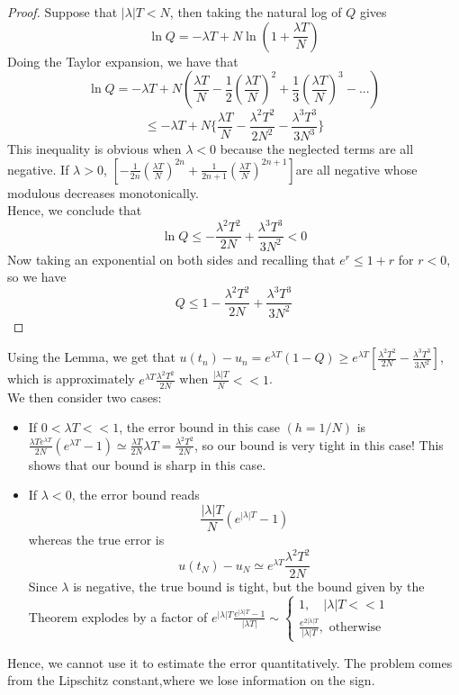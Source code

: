 \documentclass{article}
\begin{document}
\begin{remark}
\begin{enumerate}
\begin{proof}
    Suppose that $|\lambda| T < N$, then taking the natural log of $Q$ gives
    \[\ln Q = - \lambda T + N \ln(1 + \frac{\lambda T}{N})\]
    Doing the Taylor expansion, we have that
    \[\ln Q = - \lambda T + N (\frac{\lambda T}{N} - \frac{1}{2} (\frac{\lambda T}{N})^2 + \frac{1}{3} (\frac{\lambda T}{N})^3 - ...)\]
    \[\leq -\lambda T + N \{\frac{\lambda T}{N} - \frac{\lambda^2 T^2}{2N^2} - \frac{\lambda^3 T^3}{3 N^3}\}\]
    This inequality is obvious when $\lambda < 0$ because the neglected terms are all negative. If $\lambda > 0$, $[-\frac{1}{2n} (\frac{\lambda T}{N})^{2n} + \frac{1}{2n+1} (\frac{\lambda T}{N})^{2n+1}]$are all negative whose modulous decreases monotonically.\\

    Hence, we conclude that
    \[\ln Q \leq -\frac{\lambda^2 T^2}{2N} + \frac{\lambda^3 T^3}{3N^2} < 0\]
    Now taking an exponential on both sides and recalling that $e^{r} \leq 1 + r$ for $r < 0$, so we have
    \[Q \leq 1 - \frac{\lambda^2 T^2}{2N} + \frac{\lambda^3 T^3}{3N^2}\]
\end{proof}
Using the Lemma, we get that $u(t_n) - u_n = e^{\lambda T} (1 - Q) \geq e^{\lambda T} [\frac{\lambda^2 T^2}{2N} - \frac{\lambda^3 T^3}{3N^2}]$, which is approximately $e^{\lambda T} \frac{\lambda^2 T^2}{2N}$ when $\frac{|\lambda| T}{N} << 1$.\\

We then consider two cases:
\begin{itemize}
    \item If $0 < \lambda T << 1$, the error bound in this case $(h = 1/N)$ is $\frac{\lambda T e^{\lambda T}}{2N} (e^{\lambda T} - 1) \simeq \frac{\lambda T}{2N} \lambda T = \frac{\lambda^2 T^2}{2N}$, so our bound is very tight in this case! This shows that our bound is sharp in this case.
    \item If $\lambda < 0$, the error bound reads 
    \[\frac{|\lambda| T}{N} (e^{|\lambda| T} - 1)\]
    whereas the true error is
    \[u(t_N) - u_N \simeq e^{\lambda T} \frac{\lambda^2 T^2}{2N}\]
    Since $\lambda$ is negative, the true bound is tight, but the bound given by the Theorem explodes by a factor of $e^{|\lambda| T}  \frac{e^{|\lambda| T} - 1}{|\lambda T|} \sim \begin{cases}
        1, \quad |\lambda| T << 1\\
        \frac{e^{2|\lambda| T}}{|\lambda| T}, \text{ otherwise}
    \end{cases}$
\end{itemize}
Hence, we cannot use it to estimate the error quantitatively. The problem comes from the Lipschitz constant,where we lose information on the sign.
    \end{enumerate}
\end{remark}
\end{document}
